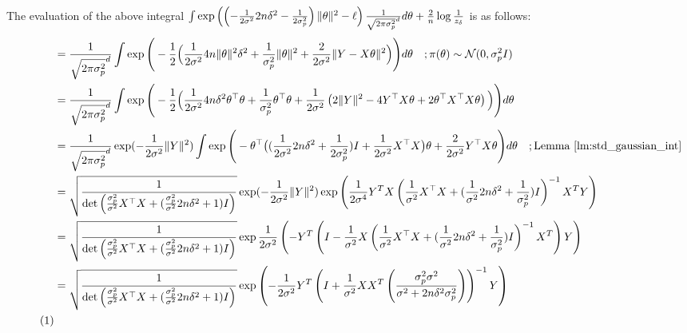 The evaluation of the above integral $\int  \exp \left( \left( -{\frac{1}{2\sigma^2}}2n \delta^2 - \frac{1}{2\sigma_p^2} \right) \|\theta\|^2 - \ell \right) \frac{1}{\sqrt{2\pi \sigma_p^2}^d} d\theta  +  \frac{2}{n} \log \frac{1}{ z_\delta }$ is as follows:
\begin{align*}
    &= \frac{1}{\sqrt{2\pi\sigma^2_p}^d}\int \exp\Bigg( -\frac{1}{2} \Big( {\frac{1}{2\sigma^2}}4 n \Vert \theta \Vert^2 \delta^2 + \frac{1}{\sigma^2_p}\Vert \theta \Vert^2 + {\frac{2}{2\sigma^2}} \Vert Y - X\theta \Vert^2  \Big) \Bigg)  d\theta  \quad; \pi(\theta) \sim \mathcal{N}(0,\sigma^2_p I)\\
    &= \frac{1}{\sqrt{2\pi\sigma^2_p}^d}\int \exp\Bigg( -\frac{1}{2} \Big( {\frac{1}{2\sigma^2}}4 n\delta^2 \theta^\top \theta  + \frac{1}{\sigma^2_p}\theta^\top \theta + {\frac{1}{2\sigma^2}} \lp 2 \Vert Y \Vert^2 - 4 Y^\top X \theta + 2 \theta^\top X^\top X \theta \rp \Big) \Bigg)  d\theta  \\
    &= \frac{1}{\sqrt{2\pi\sigma^2_p}^d} \exp(-{\frac{1}{2\sigma^2}}\Vert Y\Vert^2) \int \exp\Bigg( - \theta^\top \big( ({\frac{1}{2\sigma^2}}2 n\delta^2 + \frac{1}{2\sigma^2_p})I + {\frac{1}{2\sigma^2}} X^\top X  \big)\theta + {\frac{2}{2\sigma^2}} Y^\top X\theta \Bigg)  d\theta \quad; \text{Lemma \ref{lm:std_gaussian_int}}  \\
    &=  \sqrt{\frac{1}{\det \lp  {\frac{\sigma_p^2}{\sigma^2}}X^\top X + ( {\frac{\sigma_p^2}{\sigma^2}}2 n\delta^2 + 1)I\rp}} \exp(- {\frac{1}{2\sigma^2}}\Vert Y\Vert^2) \exp\lp  {\frac{1}{2\sigma^4}} Y^TX \lp  {\frac{1}{\sigma^2}} X^\top X + ( {\frac{1}{\sigma^2}}2 n\delta^2 + \frac{1}{\sigma^2_p})I\rp^{-1}X^TY\rp \\
    &=  \sqrt{\frac{1}{\det \lp  {\frac{\sigma_p^2}{\sigma^2}}X^\top X + ( {\frac{\sigma_p^2}{\sigma^2}}2 n\delta^2 + 1)I\rp}} \exp  {\frac{1}{2\sigma^2}} \lp - Y^T \lp I -  {\frac{1}{\sigma^2}}X \lp  {\frac{1}{\sigma^2}}X^\top X + ( {\frac{1}{\sigma^2}}2 n\delta^2 + \frac{1}{\sigma^2_p})I\rp^{-1}X^T\rp Y \rp \\
     &=  \sqrt{\frac{1}{\det \lp  {\frac{\sigma_p^2}{\sigma^2}}X^\top X + ( {\frac{\sigma_p^2}{\sigma^2}}2 n\delta^2 + 1)I\rp}} \exp \lp -  {\frac{1}{2\sigma^2}}Y^T \lp I +  {\frac{1}{\sigma^2}}XX^T \lp \frac{\sigma_p^2\sigma^2}{\sigma^2+2 n \delta^2 \sigma^2_p}\rp\rp^{-1} Y \rp \\
     \stepcounter{equation}\tag{\theequation}\label{eq:adv_post_std_loss_normz_2}
\end{align*}
